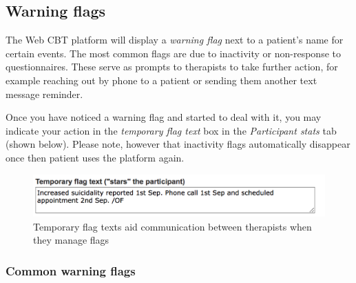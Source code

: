 \documentclass[]{book}
\theoremstyle{definition}
\theoremstyle{definition}
\theoremstyle{definition}
\theoremstyle{remark}
\begin{document}
\hypertarget{warning-flags}{%
\subsection{Warning flags}\label{warning-flags}}

The Web CBT platform will display a \emph{warning flag} next to a
patient's name for certain events. The most common flags are due to
inactivity or non-response to questionnaires. These serve as prompts to
therapists to take further action, for example reaching out by phone to
a patient or sending them another text message reminder.

Once you have noticed a warning flag and started to deal with it, you
may indicate your action in the \emph{temporary flag text} box in the
\emph{Participant stats} tab (shown below). Please note, however that
inactivity flags automatically disappear once then patient uses the
platform again.

\begin{figure}
\centering
\includegraphics{images/temporary-flag-text.png}
\caption{Temporary flag texts aid communication between therapists when
they manage flags}
\end{figure}

\hypertarget{common-warning-flags}{%
\subsubsection{Common warning flags}\label{common-warning-flags}}
\end{document}
